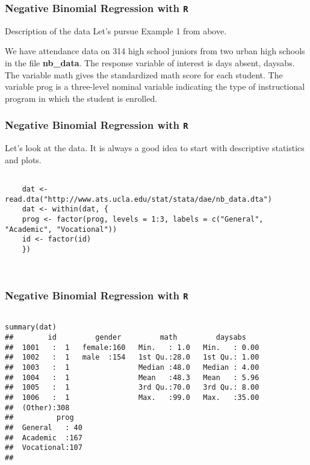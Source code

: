 \documentclass[00-GLMregslides.tex]{subfiles}
\begin{document}
\begin{frame}[fragile]
	\frametitle{Negative Binomial Regression with \texttt{R} }
	\Large
	
Description of the data
Let's pursue Example 1 from above.

We have attendance data on 314 high school juniors from two urban high schools in the file \textbf{nb\_data}. The response variable of interest is days absent, daysabs. The variable math gives the standardized math score for each student. The variable prog is a three-level nominal variable indicating the type of instructional program in which the student is enrolled.
\end{frame}
\begin{frame}[fragile]
	\frametitle{Negative Binomial Regression with \texttt{R} }
	\Large
	
Let's look at the data. It is always a good idea to start with descriptive statistics and plots.


\begin{framed}
	\begin{verbatim}
	
	dat <- read.dta("http://www.ats.ucla.edu/stat/stata/dae/nb_data.dta")
	dat <- within(dat, {
	prog <- factor(prog, levels = 1:3, labels = c("General", "Academic", "Vocational"))
	id <- factor(id)
	})
	
	
	\end{verbatim}	
\end{framed}

\end{frame}
\begin{frame}[fragile]
	\frametitle{Negative Binomial Regression with \texttt{R} }
	\Large

\begin{framed}
	\begin{verbatim}
	
summary(dat)
##        id         gender         math         daysabs     
##  1001   :  1   female:160   Min.   : 1.0   Min.   : 0.00  
##  1002   :  1   male  :154   1st Qu.:28.0   1st Qu.: 1.00  
##  1003   :  1                Median :48.0   Median : 4.00  
##  1004   :  1                Mean   :48.3   Mean   : 5.96  
##  1005   :  1                3rd Qu.:70.0   3rd Qu.: 8.00  
##  1006   :  1                Max.   :99.0   Max.   :35.00  
##  (Other):308                                              
##          prog    
##  General   : 40  
##  Academic  :167  
##  Vocational:107  
##   
	
	\end{verbatim}	
\end{framed}

	
               
\end{frame}
\end{document}
